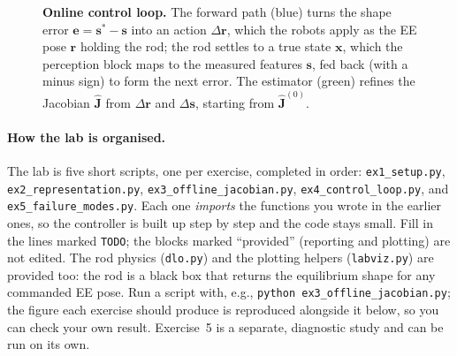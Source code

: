 \documentclass[11pt,a4paper]{article}
\begin{document}
\begin{figure}[h!]
{}
\caption{\textbf{Online control loop.} The forward path (blue) turns the shape error
$\mathbf{e}=\mathbf{s}^{*}-\mathbf{s}$ into an action $\Delta\mathbf{r}$, which the robots apply as the EE pose $\mathbf{r}$ holding
the rod; the rod settles to a true state $\mathbf{x}$, which the perception block maps to the
measured features $\mathbf{s}$, fed back (with a minus sign) to form the next error. The estimator
(green) refines the Jacobian $\hat{\mathbf{J}}$ from $\Delta\mathbf{r}$ and $\Delta\mathbf{s}$, starting from
$\hat{\mathbf{J}}^{(0)}$.}
\label{fig:loop-online}
\end{figure}

\paragraph{How the lab is organised.} The lab is five short scripts, one per exercise,
completed in order: \texttt{ex1\_setup.py}, \texttt{ex2\_representation.py},
\texttt{ex3\_offline\_jacobian.py}, \texttt{ex4\_control\_loop.py}, and
\texttt{ex5\_failure\_modes.py}. Each one \emph{imports} the functions you wrote in the
earlier ones, so the controller is built up step by step and the code stays small. Fill in
the lines marked \texttt{TODO}; the blocks marked ``provided'' (reporting and plotting) are
not edited. The rod physics (\texttt{dlo.py}) and the plotting helpers (\texttt{labviz.py})
are provided too: the rod is a black box that returns the equilibrium shape for any
commanded EE pose. Run a script with, e.g., \texttt{python ex3\_offline\_jacobian.py}; the
figure each exercise should produce is reproduced alongside it below, so you can check your
own result. Exercise~5 is a separate, diagnostic study and can be run on its own.
\end{document}
